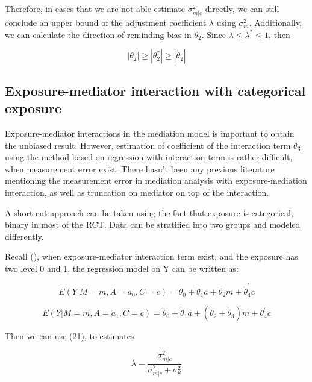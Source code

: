 \documentclass{article}
\begin{document}
Therefore, in cases that we are not able estimate $\sigma^2_{m|c} $ directly, we can still conclude an upper bound of the adjustment coefficient $\lambda$ using $\sigma^2_m$. Additionally, we can calculate the direction of reminding bias in  $\theta_2$. Since $\lambda \le \lambda^* \le 1$, then 


\begin{equation}
|\theta_2| \ge   |\theta_2^*|  \ge |\tilde \theta_2|
\end{equation}



\subsection{Exposure-mediator interaction with categorical exposure}

Exposure-mediator interactions in the mediation model is important to obtain the unbiased result. However, estimation of coefficient of the interaction term $\theta_3$ using the method based on regression with interaction term is rather difficult, when measurement error exist. There hasn't been any previous literature mentioning the measurement error in mediation analysis with exposure-mediation interaction, as well as truncation on mediator on top of the interaction. 

A short cut approach can be taken using the fact that exposure is categorical, binary in most of the RCT. Data can be stratified into two groups and modeled differently.

Recall (), when exposure-mediator interaction term exist, and the exposure has two level 0 and 1, the regression model on Y can be written as:


\begin{equation}
E (Y |M = m,A = a_0,C = c) = \theta_0+\tilde \theta_1 a+ \tilde \theta_2 m + \tilde \theta_4^{'} c
\end{equation}



\begin{equation}
E (Y |M = m,A = a_1,C = c) = \tilde \theta_0+\tilde \theta_1 a+ (\tilde \theta_2 + \tilde \theta_3) m + \theta_4^{'} c
\end{equation}


Then we can use (21), to estimates

\begin{equation}
 \lambda = \frac{\sigma_{m|c}^2}{\sigma_{m|c}^2 + \sigma_{u}^2}
\end{equation}
\end{document}
